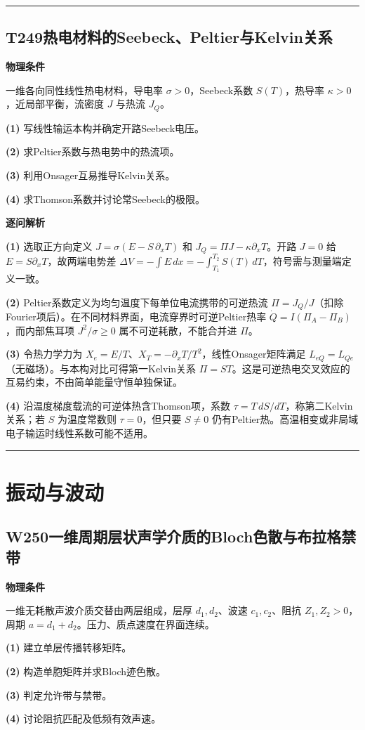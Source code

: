 \documentclass[UTF8,a4paper,11pt,oneside,openany]{ctexbook}
\begin{document}
\par\bigskip\hrule\bigskip
\section*{T249\quad 热电材料的Seebeck、Peltier与Kelvin关系}
\textbf{物理条件}\par 一维各向同性线性热电材料，导电率 \(\sigma>0\)，Seebeck系数 \(S(T)\)，热导率 \(\kappa>0\)，近局部平衡，流密度 \(J\) 与热流 \(J_Q\)。
\par\noindent\textbf{(1)} 写线性输运本构并确定开路Seebeck电压。
\par\noindent\textbf{(2)} 求Peltier系数与热电势中的热流项。
\par\noindent\textbf{(3)} 利用Onsager互易推导Kelvin关系。
\par\noindent\textbf{(4)} 求Thomson系数并讨论常Seebeck的极限。

\par\medskip\noindent\textbf{逐问解析}
\par\noindent\textbf{(1)} 选取正方向定义 \(J=\sigma(E-S\,\partial_xT)\) 和 \(J_Q=\Pi J-\kappa\partial_xT\)。开路 \(J=0\) 给 \(E=S\partial_xT\)，故两端电势差 \(\Delta V=-\int E\,dx=-\int_{T_1}^{T_2}S(T)\,dT\)，符号需与测量端定义一致。
\par\noindent\textbf{(2)} Peltier系数定义为均匀温度下每单位电流携带的可逆热流 \(\Pi=J_Q/J\)（扣除Fourier项后）。在不同材料界面，电流穿界时可逆Peltier热率 \( \dot Q=I(\Pi_A-\Pi_B)\) ，而内部焦耳项 \(J^2/\sigma\ge0\) 属不可逆耗散，不能合并进 \(\Pi\)。
\par\noindent\textbf{(3)} 令热力学力为 \(X_e=E/T\)、\(X_T=-\partial_xT/T^2\)，线性Onsager矩阵满足 \(L_{eQ}=L_{Qe}\)（无磁场）。与本构对比可得第一Kelvin关系 \(\Pi=ST\)。这是可逆热电交叉效应的互易约束，不由简单能量守恒单独保证。
\par\noindent\textbf{(4)} 沿温度梯度载流的可逆体热含Thomson项，系数 \(\tau=T\,dS/dT\)，称第二Kelvin关系；若 \(S\) 为温度常数则 \(\tau=0\)，但只要 \(S\neq0\) 仍有Peltier热。高温相变或非局域电子输运时线性系数可能不适用。

\par\bigskip\hrule\bigskip
\chapter{振动与波动}
\section*{W250\quad 一维周期层状声学介质的Bloch色散与布拉格禁带}
\textbf{物理条件}\par 一维无耗散声波介质交替由两层组成，层厚 \(d_1,d_2\)、波速 \(c_1,c_2\)、阻抗 \(Z_1,Z_2>0\)，周期 \(a=d_1+d_2\)。压力、质点速度在界面连续。
\par\noindent\textbf{(1)} 建立单层传播转移矩阵。
\par\noindent\textbf{(2)} 构造单胞矩阵并求Bloch迹色散。
\par\noindent\textbf{(3)} 判定允许带与禁带。
\par\noindent\textbf{(4)} 讨论阻抗匹配及低频有效声速。
\end{document}
